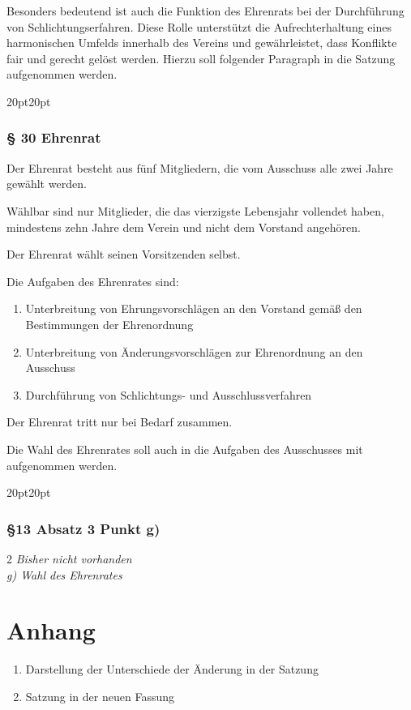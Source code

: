 \documentclass[10pt,a4paper,parskip=half]{scrartcl}
\newcommand{\change}[1]{
  \begin{adjustwidth}{20pt}{20pt}
    #1
  \end{adjustwidth}
}
\newcommand{\compare}[3]{\change{\subsubsection*{#1}\begin{multicols}{2}#2\columnbreak\\#3\end{multicols}}}
\begin{document}
  Besonders bedeutend ist auch die Funktion des Ehrenrats bei der Durchführung von Schlichtungserfahren. Diese Rolle unterstützt die Aufrechterhaltung eines harmonischen Umfelds innerhalb des Vereins und gewährleistet, dass Konflikte fair und gerecht gelöst werden.
  Hierzu soll folgender Paragraph in die Satzung aufgenommen werden.
\change{
  \subsubsection*{§ 30 Ehrenrat}
  Der Ehrenrat besteht aus fünf Mitgliedern, die vom Ausschuss alle zwei Jahre gewählt werden.

  Wählbar sind nur Mitglieder, die das vierzigste Lebensjahr vollendet haben, mindestens zehn Jahre dem Verein und nicht dem Vorstand angehören.

  Der Ehrenrat wählt seinen Vorsitzenden selbst.

  Die Aufgaben des Ehrenrates sind:

  \begin{enumerate}[label=\alph*),noitemsep]
    \item Unterbreitung von Ehrungsvorschlägen an den Vorstand gemäß den Bestimmungen der Ehrenordnung
    \item Unterbreitung von Änderungsvorschlägen zur Ehrenordnung an den Ausschuss
    \item Durchführung von Schlichtungs- und Ausschlussverfahren
  \end{enumerate}

  Der Ehrenrat tritt nur bei Bedarf zusammen.
}

Die Wahl des Ehrenrates soll auch in die Aufgaben des Ausschusses mit aufgenommen werden.

\compare{§13 Absatz 3 Punkt g)}{
  \em Bisher nicht vorhanden \em
} {
  g) Wahl des Ehrenrates
}


\section{Anhang}
\begin{enumerate}
  \item Darstellung der Unterschiede der Änderung in der Satzung
  \item Satzung in der neuen Fassung
\end{enumerate}



\end{document}
